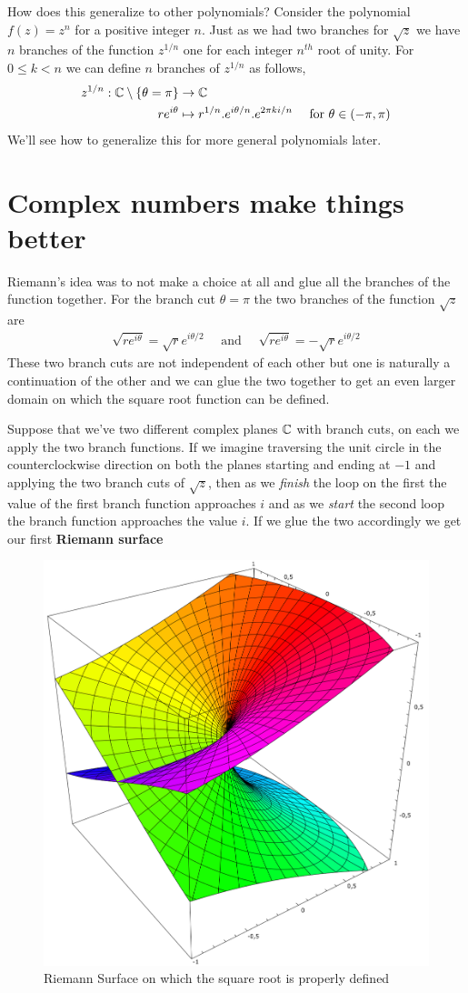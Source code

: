 How does this generalize to other polynomials? Consider the polynomial $f(z) = z^n$ for a positive integer $n$. Just as we had two branches for $\sqrt{z}$ we have $n$ branches of the function $z^{1/n}$ one for each integer $n^{th}$ root of unity. For $0 \le k < n$ we can define $n$ branches of $z^{1/n}$ as follows,
\begin{align}
	z^{1/n} : \mathbb{C} \setminus \{ \theta = \pi\} & \rightarrow \mathbb{C}                                                     \\
	r e^{i \theta} & \mapsto {r}^{1/n}.e^{i \theta/n}.e^{2 \pi k i/n} & \mbox{ for } \theta \in (-\pi,\pi)
\end{align}
We'll see how to generalize this for more general polynomials later.




\section{Complex numbers make things better}
Riemann's idea was to not make a choice at all and glue all the branches of the function together. For the branch cut $\theta = \pi$ the two branches of the function $\sqrt{z}$ are
\begin{align}
	\sqrt{r e^{i\theta}} = \sqrt{r} e^{i\theta/2} \quad \mbox{ and } \quad \sqrt{r e^{i\theta}} = -\sqrt{r} e^{i\theta/2}
\end{align}
These two branch cuts are not independent of each other but one is naturally a continuation of the other and we can glue the two together to get an even larger domain on which the square root function can be defined.

Suppose that we've two different complex planes $\mathbb{C}$ with branch cuts, on each we apply the two branch functions. If we imagine traversing the unit circle in the counterclockwise direction on both the planes starting and ending at $-1$ and applying the two branch cuts of $\sqrt{z}$, then as we \emph{finish} the loop on the first the value of the first branch function approaches $i$ and as we \emph{start} the second loop the branch function approaches the value $i$. If we glue the two accordingly we get our first \textbf{Riemann surface}

\begin{figure}[H]
	\centering
	\includegraphics[width=0.35\linewidth]{images/sqrt}
	\caption{Riemann Surface on which the square root is properly defined}
	\label{thm:img1}
\end{figure}

